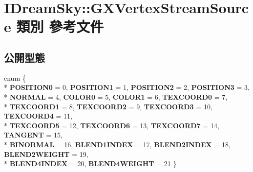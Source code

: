 \hypertarget{class_i_dream_sky_1_1_g_x_vertex_stream_source}{}\section{I\+Dream\+Sky\+:\+:G\+X\+Vertex\+Stream\+Source 類別 參考文件}
\label{class_i_dream_sky_1_1_g_x_vertex_stream_source}
\subsection*{公開型態}
\begin{DoxyCompactItemize}
\item 
enum \{ \\*
{\bfseries P\+O\+S\+I\+T\+I\+O\+N0} = 0, 
{\bfseries P\+O\+S\+I\+T\+I\+O\+N1} = 1, 
{\bfseries P\+O\+S\+I\+T\+I\+O\+N2} = 2, 
{\bfseries P\+O\+S\+I\+T\+I\+O\+N3} = 3, 
\\*
{\bfseries N\+O\+R\+M\+AL} = 4, 
{\bfseries C\+O\+L\+O\+R0} = 5, 
{\bfseries C\+O\+L\+O\+R1} = 6, 
{\bfseries T\+E\+X\+C\+O\+O\+R\+D0} = 7, 
\\*
{\bfseries T\+E\+X\+C\+O\+O\+R\+D1} = 8, 
{\bfseries T\+E\+X\+C\+O\+O\+R\+D2} = 9, 
{\bfseries T\+E\+X\+C\+O\+O\+R\+D3} = 10, 
{\bfseries T\+E\+X\+C\+O\+O\+R\+D4} = 11, 
\\*
{\bfseries T\+E\+X\+C\+O\+O\+R\+D5} = 12, 
{\bfseries T\+E\+X\+C\+O\+O\+R\+D6} = 13, 
{\bfseries T\+E\+X\+C\+O\+O\+R\+D7} = 14, 
{\bfseries T\+A\+N\+G\+E\+NT} = 15, 
\\*
{\bfseries B\+I\+N\+O\+R\+M\+AL} = 16, 
{\bfseries B\+L\+E\+N\+D1\+I\+N\+D\+EX} = 17, 
{\bfseries B\+L\+E\+N\+D2\+I\+N\+D\+EX} = 18, 
{\bfseries B\+L\+E\+N\+D2\+W\+E\+I\+G\+HT} = 19, 
\\*
{\bfseries B\+L\+E\+N\+D4\+I\+N\+D\+EX} = 20, 
{\bfseries B\+L\+E\+N\+D4\+W\+E\+I\+G\+HT} = 21
 \}\hypertarget{class_i_dream_sky_1_1_g_x_vertex_stream_source_a1b2a730de366d6542ea4f1d20199ff66}{}\label{class_i_dream_sky_1_1_g_x_vertex_stream_source_a1b2a730de366d6542ea4f1d20199ff66}

\end{DoxyCompactItemize}
